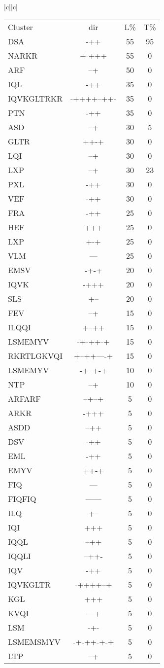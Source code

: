 \documentclass[table,
12pt, %
a4paper, %
oneside, %
headinclude,footinclude, %
BCOR5mm, %
]{scrartcl}
\begin{document}
\begin{table}[htbp]
\begin{adjustbox}{totalheight=\textheight,center}
\begin{tabular}{|c||c|}
\begin{tabular}{l ccc}
Cluster&dir& L\%&T\%\\
DSA&-++&55&95\\
NARKR&+-+++&55&0\\
ARF&--+&50&0\\
IQL&-++&35&0\\
IQVKGLTRKR&-++++--++-&35&0\\
PTN&-++&35&0\\
ASD&--+&30&5\\
GLTR&++-+&30&0\\
LQI&--+&30&0\\
LXP&--+&30&23\\
PXL&-++&30&0\\
VEF&-++&30&0\\
FRA&-++&25&0\\
HEF&+++&25&0\\
LXP&+-+&25&0\\
VLM&---&25&0\\
EMSV&-+-+&20&0\\
IQVK&-+++&20&0\\
SLS&+--&20&0\\
FEV&--+&15&0\\
ILQQI&+--++&15&0\\
LSMEMYV&-+-++-+&15&0\\
RKRTLGKVQI&+--++----+&15&0\\
LSMEMYV&-+--+-+&10&0\\
NTP&--+&10&0\\
ARFARF&--+--+&5&0\\
ARKR&-+++&5&0\\
ASDD&--++&5&0\\
DSV&-++&5&0\\
EML&-++&5&0\\
EMYV&++-+&5&0\\
FIQ&---&5&0\\
FIQFIQ&------&5&0\\
ILQ&+--&5&0\\
IQI&+++&5&0\\
IQQL&--++&5&0\\
IQQLI&--++-&5&0\\
IQV&-++&5&0\\
IQVKGLTR&-++++--+&5&0\\
KGL&+++&5&0\\
KVQI&---+&5&0\\
LSM&-+-&5&0\\
LSMEMSMYV&-+-++-+-+&5&0\\
LTP&--+&5&0\\

\end{tabular}
\end{tabular}
\end{adjustbox}
\end{table}
\end{document}
